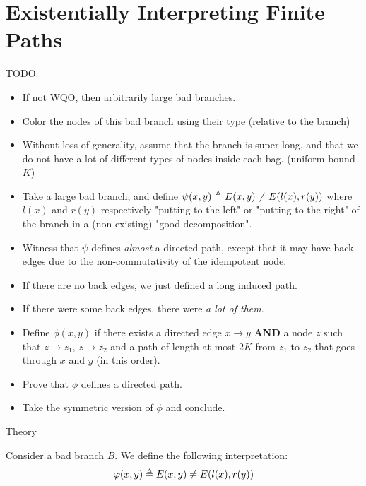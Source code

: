 \section{Existentially Interpreting Finite Paths}
\label{sec:interpreting-paths}

TODO:
\begin{itemize}
    \item If not WQO, then arbitrarily large bad branches.
    \item Color the nodes of this bad branch using their type (relative to the branch)
    \item Without loss of generality, assume that the branch is super long, and that
        we do not have a lot of different types of nodes inside each bag.
        (uniform bound $K$)
    \item Take a large bad branch, and define 
        $\psi(x,y) \triangleq E(x,y) \neq E(l(x), r(y))$ where
        $l(x)$ and $r(y)$ respectively "putting to the left" or 
        "putting to the right" of the branch in a (non-existing) "good decomposition".
    \item Witness that $\psi$ defines \emph{almost} a directed path, except
        that it may have back edges due to the non-commutativity of the idempotent node.
    \item If there are no back edges, we just defined a long induced path.
    \item If there were some back edges, there were \emph{a lot of them}.
    \item Define $\phi(x,y)$ if there exists a directed edge $x \to y$
        \textbf{AND} a node $z$ such that $z \to z_1$, $z \to z_2$
        and a path of length at most $2K$ from $z_1$  to $z_2$
        that goes through $x$ and $y$ (in this order).
    \item Prove that $\phi$ defines a directed path.
    \item Take the symmetric version of $\phi$ and conclude.
\end{itemize}
 Theory

Consider a bad branch $B$. We define the following interpretation:
\begin{equation*}
    \varphi(x,y) \triangleq 
    E(x,y) \neq E(l(x), r(y))
\end{equation*}

